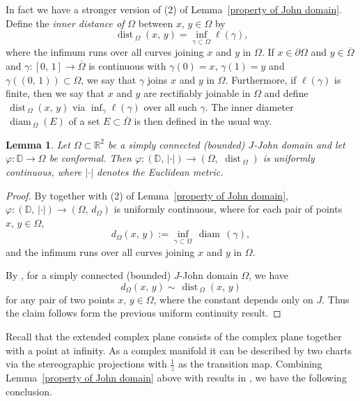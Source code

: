 \documentclass[reqno,11pt]{amsart}
\makeatletter
\def\dist{{\mathop\mathrm{\,dist\,}}}
\def\diam{{\mathop\mathrm{\,diam\,}}}
\newtheorem{lem}[thm]{Lemma}%
\numberwithin{equation}{section}
\theoremstyle{remark}
\makeatother
\begin{document}
In fact we have a stronger version of (2) of Lemma~\ref{property of John domain}. 
Define the {\it{inner distance of $\Omega$}} between 
$x,\,y\in\Omega$ by
$$\dist_{\Omega}(x,\,y)=\inf_{\gamma\subset \Omega} \ell(\gamma),$$
where the infimum runs over all curves joining $x$ and $y$ in $\Omega.$ If $x\in \partial\Omega$ and $y\in \overline{\Omega}$ and $\gamma\colon [0,\,1]\to \overline{\Omega}$ is continuous with $\gamma(0)=x$,  $\gamma(1)=y$ and $\gamma((0,\,1))\subset\Omega$, we say that $\gamma$ joins $x$ and $y$ in $\Omega$. Furthermore, if $\ell(\gamma)$ is finite, then we say that $x$ and $y$ are rectifiably joinable in $\Omega$ and define $\dist_{\Omega}(x,\,y)$ via $\inf_{\gamma} \ell(\gamma)$ over all such $\gamma$.  
The inner diameter $\diam_{\Omega}(E)$ of a set $E\subset \overline{\Omega}$ is then defined in
the usual way. 

\begin{lem}\label{inner continuous}
Let $\Omega\subset \mathbb R^2$  be a simply connected (bounded) $J$-John domain 
 and let $\varphi \colon \mathbb D \to \Omega$ be conformal. Then   $\varphi\colon (\mathbb D,\,|\cdot|)\to (\Omega,\,\dist_{\Omega})$  is uniformly continuous, where $|\cdot|$ denotes the Euclidean metric. 
\end{lem}
\begin{proof}
By \cite{H2012} together with  (2) of Lemma~\ref{property of John domain}, 
$\varphi\colon (\mathbb D,\,|\cdot|)\to (\Omega,\,d_{\Omega})$ is uniformly continuous, where for each pair of points $x,\,y\in \Omega$,
$$d_{\Omega}(x,\,y):=\inf_{\gamma\subset \Omega} \diam(\gamma),$$
and the infimum runs over all curves joining $x$ and $y$ in $\Omega.$

By \cite[Theorem 5.14]{GNV94}, for a simply connected (bounded) $J$-John domain $\Omega$, we have 
$$d_{\Omega}(x,\,y)\sim \dist_{\Omega}(x,\,y)$$
for  any pair of two points $x,\,y\in \Omega$, where the constant   depends only on $J$.
Thus  the claim follows form the previous uniform continuity result. 
\end{proof}

Recall that the extended complex plane consists of the complex plane together with a point at infinity. As a complex manifold it can be described by two charts via the stereographic projections with $\frac 1 z$ as the transition map.
Combining Lemma~\ref{property of John domain} above with results in \cite{DH}, we have the following conclusion. 

\end{document}
